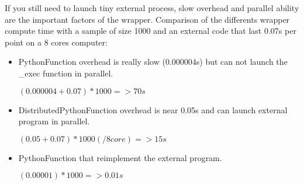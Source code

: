 If you still need to launch tiny external process, slow overhead and parallel ability are the important factors of the wrapper.
Comparison of the differents wrapper compute time with a sample of size 1000 and an external code that last 0.07s per point on a 8 cores computer:

\begin{itemize}
\item PythonFunction overhead is really slow (0.000004s) but can not launch the \_exec function in parallel.

  $(0.000004+0.07)*1000 => 70s$
\item DistributedPythonFunction overhead is near 0.05s and can launch external program in parallel.

  $(0.05+0.07)*1000 (/8core) => 15s$

\item PythonFunction that reimplement the external program.

  $(0.00001)*1000 => 0.01s$

\end{itemize}

